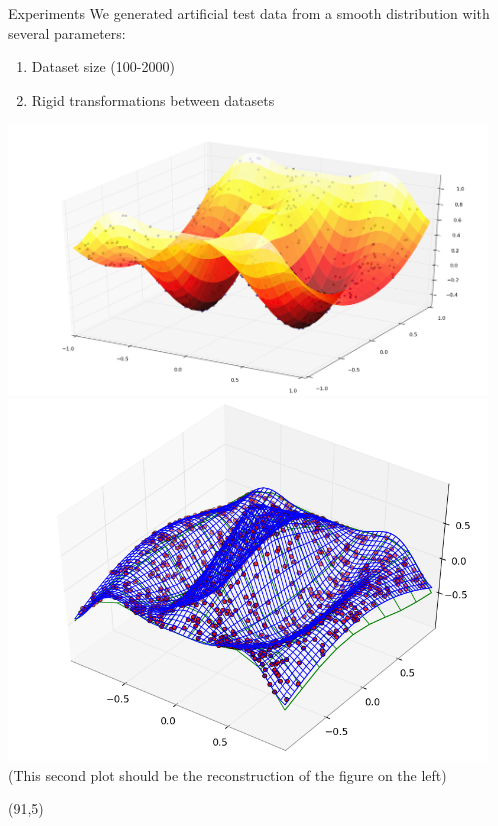 \documentclass[final]{beamer}
\begin{document}
\begin{frame}{}
\begin{textblock}{27}
\begin{block}{Experiments}
We generated artificial test data from a smooth distribution with several parameters:
\begin{enumerate}
\item Dataset size (100-2000)
\item Rigid transformations between datasets
\end{enumerate}
\includegraphics[width=5in]{DistributionPlusPoints.png}
\includegraphics[width=5in]{Reconstruction.png}
(This second plot should be the reconstruction of the figure on the left)
\end{block}

\end{textblock}


\begin{textblock}{27}(91,5)


\end{textblock}
\end{frame}
\end{document}
